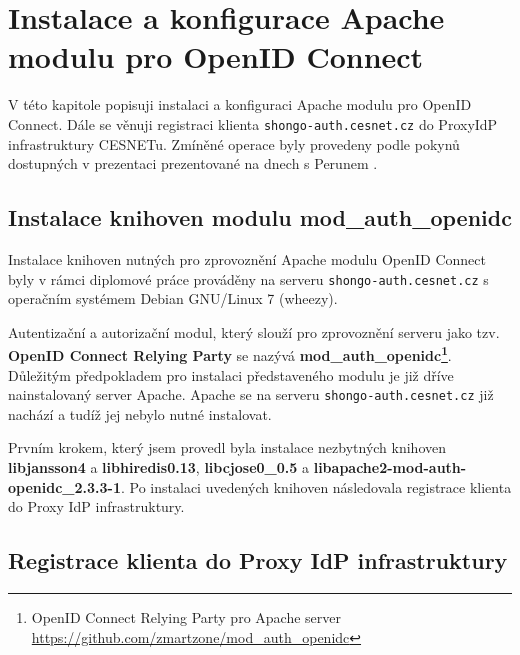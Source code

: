 \documentclass[
  printed, %
  twoside, %
  table,   %
  nolof,     %
  nolot,     %
]{fithesis3}
\begin{document}
\section{Instalace a konfigurace Apache modulu pro OpenID Connect}
V této kapitole popisuji instalaci a konfiguraci Apache modulu pro OpenID Connect. Dále se věnuji registraci klienta \texttt{shongo-auth.cesnet.cz} do ProxyIdP infrastruktury CESNETu. Zmíněné operace byly provedeny podle pokynů dostupných v prezentaci prezentované na dnech s Perunem \cite{oidcConfigPresentation}.

\label{apacheConfig}
\subsection{Instalace knihoven modulu mod\_auth\_openidc}
Instalace knihoven nutných pro zprovoznění Apache modulu OpenID Connect byly v rámci diplomové práce prováděny na serveru \texttt{shongo-auth.cesnet.cz} s operačním systémem Debian GNU/Linux 7 (wheezy). 
\par 
Autentizační a autorizační modul, který slouží pro zprovoznění serveru jako tzv. \textbf{OpenID Connect Relying Party} se nazývá \textbf{mod\_auth\_openidc\footnote{OpenID Connect Relying Party pro Apache server \url{https://github.com/zmartzone/mod\_auth\_openidc}}}. Důležitým předpokladem pro instalaci představeného modulu je již dříve nainstalovaný server Apache. Apache se na serveru \texttt{shongo-auth.cesnet.cz} již nachází a tudíž jej nebylo nutné instalovat. 
\par 
Prvním krokem, který jsem provedl byla instalace nezbytných knihoven \textbf{libjansson4} a \textbf{libhiredis0.13}, \textbf{libcjose0\_0.5} a \textbf{libapache2-mod-auth-openidc\_2.3.3-1}. Po instalaci uvedených knihoven následovala registrace klienta do Proxy IdP infrastruktury. 

\subsection{Registrace klienta do Proxy IdP infrastruktury}
\end{document}
